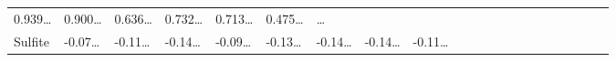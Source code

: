 \documentclass[
]{article}
\begin{document}
\begin{longtable}[]{@{}lllllllllllllllllllll@{}}
\begin{minipage}[t]{0.03\columnwidth}
0.939\ldots{}\strut
\end{minipage} & \begin{minipage}[t]{0.03\columnwidth}\raggedright
0.900\ldots{}\strut
\end{minipage} & \begin{minipage}[t]{0.03\columnwidth}\raggedright
0.636\ldots{}\strut
\end{minipage} & \begin{minipage}[t]{0.03\columnwidth}\raggedright
0.732\ldots{}\strut
\end{minipage} & \begin{minipage}[t]{0.03\columnwidth}\raggedright
0.713\ldots{}\strut
\end{minipage} & \begin{minipage}[t]{0.03\columnwidth}\raggedright
0.475\ldots{}\strut
\end{minipage} & \begin{minipage}[t]{0.01\columnwidth}\raggedright
\ldots{}\strut
\end{minipage}\tabularnewline
\begin{minipage}[t]{0.03\columnwidth}\raggedright
Sulfite\strut
\end{minipage} & \begin{minipage}[t]{0.03\columnwidth}\raggedright
-0.07\ldots{}\strut
\end{minipage} & \begin{minipage}[t]{0.03\columnwidth}\raggedright
-0.11\ldots{}\strut
\end{minipage} & \begin{minipage}[t]{0.03\columnwidth}\raggedright
-0.14\ldots{}\strut
\end{minipage} & \begin{minipage}[t]{0.03\columnwidth}\raggedright
-0.09\ldots{}\strut
\end{minipage} & \begin{minipage}[t]{0.03\columnwidth}\raggedright
-0.13\ldots{}\strut
\end{minipage} & \begin{minipage}[t]{0.03\columnwidth}\raggedright
-0.14\ldots{}\strut
\end{minipage} & \begin{minipage}[t]{0.03\columnwidth}\raggedright
-0.14\ldots{}\strut
\end{minipage} & \begin{minipage}[t]{0.03\columnwidth}\raggedright
-0.11\ldots{}\strut
\end{minipage} & \begin{minipage}[t]{0.03\columnwidth}\raggedright

\end{minipage}
\end{longtable}
\end{document}

